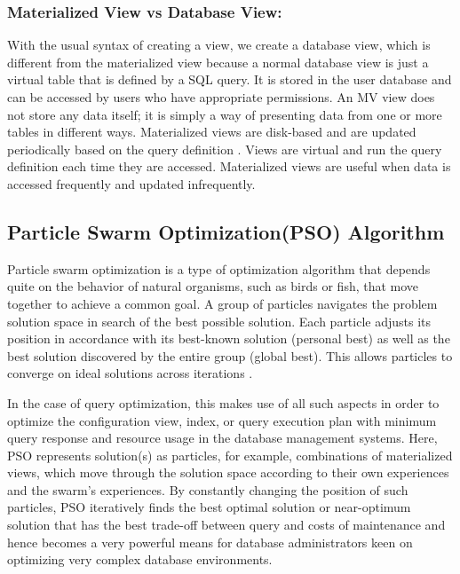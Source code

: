 \subsubsection{Materialized View vs Database View:} With the usual syntax of creating a view, we create a database view, which is different from the materialized view because a normal database view is just a virtual table that is defined by a SQL query. It is stored in the user database and can be accessed by users who have appropriate permissions. An MV view does not store any data itself; it is simply a way of presenting data from one or more tables in different ways. Materialized views are disk-based and are updated periodically based on the query definition \cite{Stackoverflow-author-08-2008}. Views are virtual and run the query definition each time they are accessed. Materialized views are useful when data is accessed frequently and updated infrequently.

\subsection{Particle Swarm Optimization(PSO) Algorithm}
Particle swarm optimization is a type of optimization algorithm that depends quite on the behavior of natural organisms, such as birds or fish, that move together to achieve a common goal. A group of particles navigates the problem solution space in search of the best possible solution. Each particle adjusts its position in accordance with its best-known solution (personal best) as well as the best solution discovered by the entire group (global best). This allows particles to converge on ideal solutions across iterations \cite{subhasis-2023}.\vspace{.4cm}

 In the case of query optimization, this makes use of all such aspects in order to optimize the configuration view, index, or query execution plan with minimum query response and resource usage in the database management systems. Here, PSO represents solution(s) as particles, for example, combinations of materialized views, which move through the solution space according to their own experiences and the swarm's experiences. By constantly changing the position of such particles, PSO iteratively finds the best optimal solution or near-optimum solution that has the best trade-off between query and costs of maintenance and hence becomes a very powerful means for database administrators keen on optimizing very complex database environments.\vspace{.4cm}

